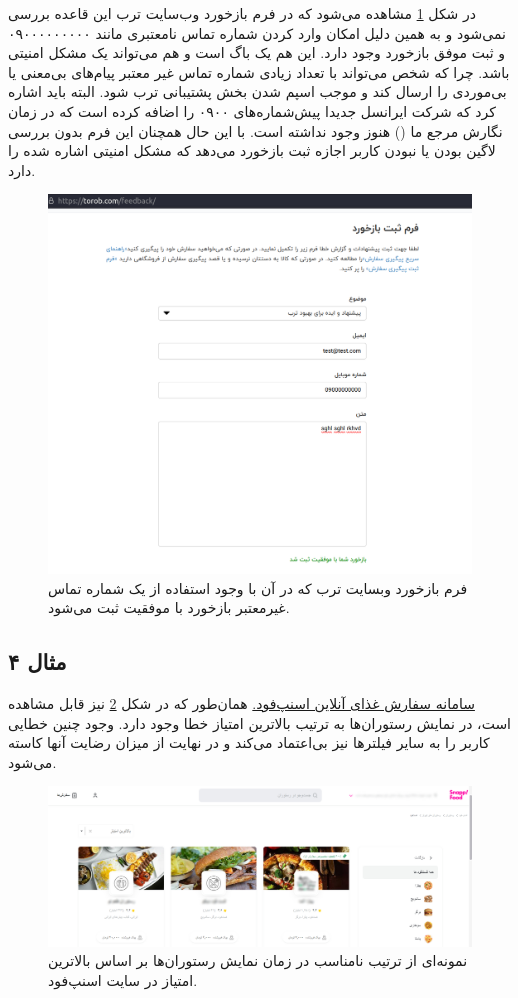 {در شکل \ref{fig:bug3} مشاهده می‌شود که در فرم بازخورد وب‌سایت ترب این قاعده بررسی نمی‌شود و به همین دلیل امکان وارد کردن شماره تماس نامعتبری مانند ۰۹۰۰۰۰۰۰۰۰۰ و ثبت موفق بازخورد وجود دارد. این هم یک باگ است و هم می‌تواند یک مشکل امنیتی باشد. چرا که شخص می‌تواند با تعداد زیادی شماره تماس غیر معتبر پیام‌های بی‌معنی یا بی‌موردی را ارسال کند و موجب اسپم شدن بخش پشتیبانی ترب شود. البته باید اشاره کرد که شرکت ایرانسل جدیدا پیش‌شماره‌های ۰۹۰۰ را اضافه کرده است که در زمان نگارش مرجع ما (\cite{phoneregex}) هنوز وجود نداشته است. با این حال همچنان این فرم بدون بررسی لاگین بودن یا نبودن کاربر اجازه ثبت بازخورد می‌دهد که مشکل امنیتی اشاره شده را دارد.

\begin{figure}[H]
	\centering
	\includegraphics[width=0.35\linewidth]{figs/bug3}
	\caption[فرم بازخورد وبسایت ترب]{فرم بازخورد وبسایت ترب که در آن با وجود استفاده از یک شماره تماس غیرمعتبر بازخورد با موفقیت ثبت می‌شود.}
	\label{fig:bug3}
\end{figure}


\subsection*{مثال ۴}
\href{https://snappfood.ir/service/restaurant/city/Tehran/near?page=0&section=SERVICES&sort=max_rate&superType=1}{سامانه سفارش غذای آنلاین اسنپ‌فود.}
همان‌طور که در شکل \ref{fig:bug4} نیز قابل مشاهده است، در نمایش رستوران‌ها به ترتیب بالاترین امتیاز خطا وجود دارد. وجود چنین خطایی کاربر را به سایر فیلترها نیز بی‌اعتماد می‌کند و در نهایت از میزان رضایت آنها کاسته می‌شود.

\begin{figure}[H]
	\centering
	\includegraphics[width=0.7\linewidth]{figs/bug4.jpg}
	\caption{نمونه‌ای از ترتیب نامناسب در زمان نمایش رستوران‌ها بر اساس بالاترین امتیاز در سایت اسنپ‌فود.}
	\label{fig:bug4}
\end{figure}

}
